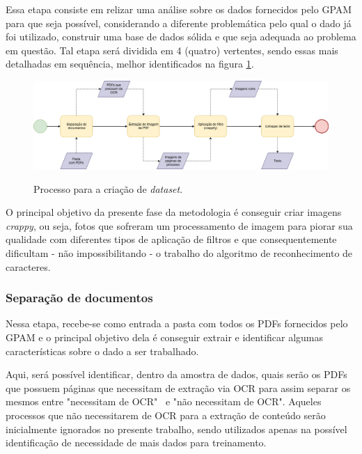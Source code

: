 Essa etapa consiste em relizar uma análise sobre os dados fornecidos pelo GPAM para que seja possível, considerando a diferente problemática pelo qual o dado já foi utilizado, construir uma base de dados sólida e que seja adequada ao problema em questão. Tal etapa será dividida em 4 (quatro) vertentes, sendo essas mais detalhadas em sequência, melhor identificados na figura \ref{fig:crappy-flow-diagram}.

\begin{figure}[H]
  \centering
  \caption{Processo para a criação de \textit{dataset}.}
  \includegraphics[width=\linewidth, rotate=0]{figuras/crappy-flow-diagram.png}
  \label{fig:crappy-flow-diagram}
\end{figure}

O principal objetivo da presente fase da metodologia é conseguir criar imagens \textit{crappy}, ou seja, fotos que sofreram um processamento de imagem para piorar sua qualidade com diferentes tipos de aplicação de filtros e que consequentemente dificultam - não impossibilitando - o trabalho do algoritmo de reconhecimento de caracteres.


\subsubsection{Separação de documentos} \label{sssec:documents-split}

Nessa etapa, recebe-se como entrada a pasta com todos os PDFs fornecidos pelo GPAM e o principal objetivo dela é conseguir extrair e identificar algumas características sobre o dado a ser trabalhado.

Aqui, será possível identificar, dentro da amostra de dados, quais serão os PDFs que possuem páginas que necessitam de extração via OCR para assim separar os mesmos entre "necessitam de OCR" \  e "não necessitam de OCR". Aqueles processos que não necessitarem de OCR para a extração de conteúdo serão inicialmente ignorados no presente trabalho, sendo utilizados apenas na possível identificação de necessidade de mais dados para treinamento.



